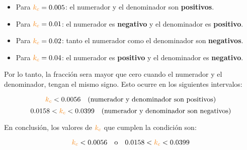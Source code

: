 \begin{itemize}
    \item Para \( \nara{k_c} = 0.005 \): el numerador y el denominador son \textbf{positivos}.
    \item Para \( \nara{k_c} = 0.01 \): el numerador es \textbf{negativo} y el denominador es \textbf{positivo}.
    \item Para \( \nara{k_c} = 0.02 \): tanto el numerador como el denominador son \textbf{negativos}.
    \item Para \( \nara{k_c} = 0.04 \): el numerador es \textbf{positivo} y el denominador es \textbf{negativo}.
\end{itemize}

Por lo tanto, la fracción sera mayor que cero cuando el numerador y el denominador, tengan el mismo signo. Esto ocurre en los siguientes intervalos:

\[
\nara{k_c} < 0.0056 \quad \text{(numerador y denominador son positivos)}
\]
\[
0.0158 < \nara{k_c} < 0.0399 \quad \text{(numerador y denominador son negativos)}
\]

En conclusión, los valores de $\nara{k_c}$ que cumplen la condición son:

\[
\nara{k_c} < 0.0056 \quad \text{o} \quad 0.0158 < \nara{k_c} < 0.0399
\]


